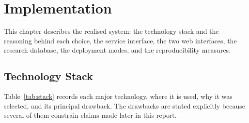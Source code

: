 \chapter{Implementation}
\label{ch:implementation}

This chapter describes the realised system: the technology stack and the
reasoning behind each choice, the service interface, the two web interfaces, the
research database, the deployment modes, and the reproducibility measures.

\section{Technology Stack}
\label{sec:stack}

Table~\ref{tab:stack} records each major technology, where it is used, why it
was selected, and its principal drawback. The drawbacks are stated explicitly
because several of them constrain claims made later in this report.

